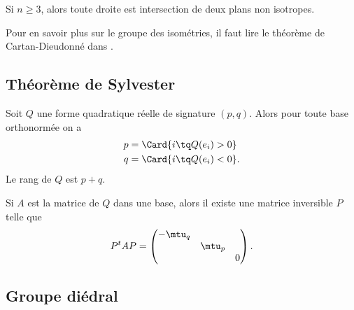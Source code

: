 \begin{lemma}
    Si \( n\geq 3\), alors toute droite est intersection de deux plans non isotropes.
\end{lemma}

Pour en savoir plus sur le groupe des isométries, il faut lire le théorème de Cartan-Dieudonné dans \cite{JGAdTA}.


\subsection{Théorème de Sylvester}


\begin{theorem}[de Sylvester]   \label{ThoQFVsBCk}
    Soit $Q$ une forme quadratique réelle de signature \( (p,q)\). Alors pour toute base orthonormée on a
    \begin{subequations}
        \begin{align}
            p&=\Card\{ i\tq Q(e_i)>0 \}\\
            q&=\Card\{ i\tq Q(e_i)<0 \}.
        \end{align}
    \end{subequations}
    Le rang de \( Q\) est \( p+q\).

    Si \( A\) est la matrice de \( Q\) dans une base, alors il existe une matrice inversible \( P\) telle que
    \begin{equation}
        P^tAP=\begin{pmatrix}
            -\mtu_q    &       &       \\
                &   \mtu_p    &       \\
                &       &   0
        \end{pmatrix}.
    \end{equation}
\end{theorem}

\subsection{Groupe diédral}
\label{subsecHibJId}

